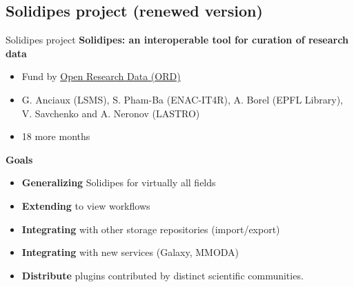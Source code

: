 \documentclass[10pt,compress,serif,aspectratio=169]{beamer}
\begin{document}
%

\subsection{Solidipes project (renewed version)}
\begin{frame}{Solidipes project}
\textbf{Solidipes: an interoperable tool for curation of research data}
  \begin{itemize}
  \item Fund by \href{https://ethrat.ch/en/eth-domain/open-research-data/}{Open Research Data (ORD)}
  \item G. Anciaux (LSMS), S. Pham-Ba (ENAC-IT4R), A. Borel (EPFL Library), V. Savchenko and
A. Neronov (LASTRO)
  \item 18 more months
\end{itemize}
\vfill
\textbf{Goals}
\begin{itemize}
 \item \textbf{Generalizing} Solidipes for virtually all fields
 \item \textbf{Extending} to view workflows
 \item \textbf{Integrating} with other storage repositories (import/export)
 \item \textbf{Integrating} with new services (Galaxy, MMODA)
 \item \textbf{Distribute} plugins contributed by distinct scientific communities.
\end{itemize}
\end{frame}
\end{document}
